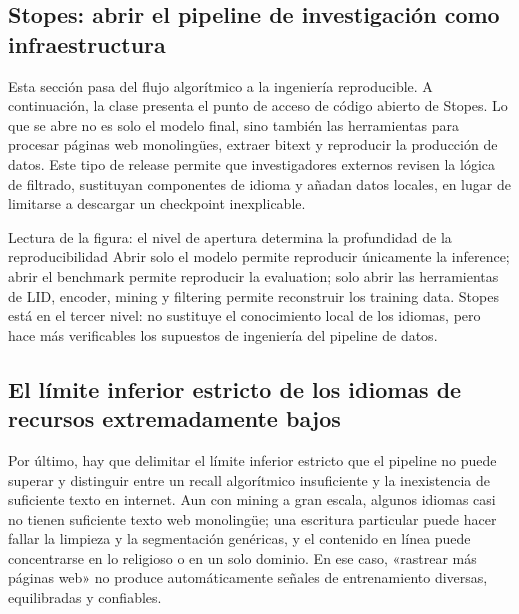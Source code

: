 \subsection{Stopes: abrir el pipeline de investigación como infraestructura}

Esta sección pasa del flujo algorítmico a la ingeniería reproducible. A continuación, la clase presenta el punto de acceso de código abierto de Stopes. Lo que se abre no es solo el modelo final, sino también las herramientas para procesar páginas web monolingües, extraer bitext y reproducir la producción de datos. Este tipo de release permite que investigadores externos revisen la lógica de filtrado, sustituyan componentes de idioma y añadan datos locales, en lugar de limitarse a descargar un checkpoint inexplicable.


\begin{knowledgebox}{Lectura de la figura: el nivel de apertura determina la profundidad de la reproducibilidad}
Abrir solo el modelo permite reproducir únicamente la inference; abrir el benchmark permite reproducir la evaluation; solo abrir las herramientas de LID, encoder, mining y filtering permite reconstruir los training data. Stopes está en el tercer nivel: no sustituye el conocimiento local de los idiomas, pero hace más verificables los supuestos de ingeniería del pipeline de datos.
\end{knowledgebox}

\subsection{El límite inferior estricto de los idiomas de recursos extremadamente bajos}

Por último, hay que delimitar el límite inferior estricto que el pipeline no puede superar y distinguir entre un recall algorítmico insuficiente y la inexistencia de suficiente texto en internet. Aun con mining a gran escala, algunos idiomas casi no tienen suficiente texto web monolingüe; una escritura particular puede hacer fallar la limpieza y la segmentación genéricas, y el contenido en línea puede concentrarse en lo religioso o en un solo dominio. En ese caso, «rastrear más páginas web» no produce automáticamente señales de entrenamiento diversas, equilibradas y confiables.

